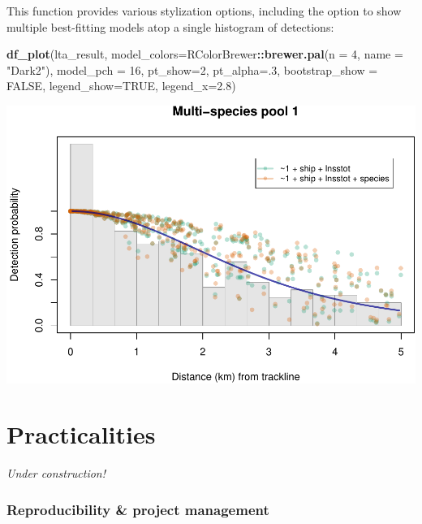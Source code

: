 \documentclass[
]{book}
\newenvironment{Shaded}{\begin{snugshade}}{\end{snugshade}}
\newcommand{\DataTypeTok}[1]{\textcolor[rgb]{0.13,0.29,0.53}{#1}}
\newcommand{\DecValTok}[1]{\textcolor[rgb]{0.00,0.00,0.81}{#1}}
\newcommand{\FloatTok}[1]{\textcolor[rgb]{0.00,0.00,0.81}{#1}}
\newcommand{\KeywordTok}[1]{\textcolor[rgb]{0.13,0.29,0.53}{\textbf{#1}}}
\newcommand{\NormalTok}[1]{#1}
\newcommand{\OperatorTok}[1]{\textcolor[rgb]{0.81,0.36,0.00}{\textbf{#1}}}
\newcommand{\OtherTok}[1]{\textcolor[rgb]{0.56,0.35,0.01}{#1}}
\newcommand{\StringTok}[1]{\textcolor[rgb]{0.31,0.60,0.02}{#1}}
\begin{document}
This function provides various stylization options, including the option to show multiple best-fitting models atop a single histogram of detections:

\begin{Shaded}
\begin{Highlighting}[]
\KeywordTok{df_plot}\NormalTok{(lta_result,}
        \DataTypeTok{model_colors=}\NormalTok{RColorBrewer}\OperatorTok{::}\KeywordTok{brewer.pal}\NormalTok{(}\DataTypeTok{n =} \DecValTok{4}\NormalTok{, }\DataTypeTok{name =} \StringTok{"Dark2"}\NormalTok{),}
        \DataTypeTok{model_pch =} \DecValTok{16}\NormalTok{,}
        \DataTypeTok{pt_show=}\DecValTok{2}\NormalTok{,}
        \DataTypeTok{pt_alpha=}\NormalTok{.}\DecValTok{3}\NormalTok{,}
        \DataTypeTok{bootstrap_show =} \OtherTok{FALSE}\NormalTok{,}
        \DataTypeTok{legend_show=}\OtherTok{TRUE}\NormalTok{,}
        \DataTypeTok{legend_x=}\FloatTok{2.8}\NormalTok{)}
\end{Highlighting}
\end{Shaded}

\includegraphics{figures/unnamed-chunk-257-1.pdf}

\hypertarget{practicalities}{%
\chapter{Practicalities}\label{practicalities}}

\emph{Under construction!}

\hypertarget{reproducibility-project-management}{%
\subsection*{Reproducibility \& project management}\label{reproducibility-project-management}}
\end{document}

